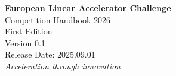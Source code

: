 
\begin{titlepage}
    \centering
    \vspace*{2cm}
    {\Huge\bfseries European Linear Accelerator Challenge\\[0.5cm]}
    {\LARGE Competition Handbook 2026\\[2cm]}
    {\Large First Edition\\[2cm]}
    {\Large Version 0.1\\[0.5cm]}
    {\large Release Date: 2025.09.01\\[2cm]}
    \vfill
    {\large\textit{Acceleration through innovation}}\\[1cm]
\end{titlepage}